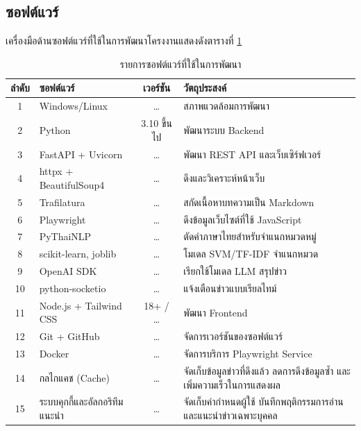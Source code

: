 \subsection{ซอฟต์แวร์}

เครื่องมือด้านซอฟต์แวร์ที่ใช้ในการพัฒนาโครงงานแสดงดังตารางที่ \ref{tab:software}

\begin{table}[H]
\centering
\caption{รายการซอฟต์แวร์ที่ใช้ในการพัฒนา}
\label{tab:software}
\begin{tabular}{|c|l|c|p{5.5cm}|}
\hline
\textbf{ลำดับ} & \textbf{ซอฟต์แวร์} & \textbf{เวอร์ชัน} & \textbf{วัตถุประสงค์} \\
\hline
1 & Windows/Linux & \ldots & สภาพแวดล้อมการพัฒนา \\ \hline
2 & Python & 3.10 ขึ้นไป & พัฒนาระบบ Backend \\ \hline
3 & FastAPI + Uvicorn & \ldots & พัฒนา REST API และเว็บเซิร์ฟเวอร์ \\ \hline
4 & httpx + BeautifulSoup4 & \ldots & ดึงและวิเคราะห์หน้าเว็บ \\ \hline
5 & Trafilatura & \ldots & สกัดเนื้อหาบทความเป็น Markdown \\ \hline
6 & Playwright & \ldots & ดึงข้อมูลเว็บไซต์ที่ใช้ JavaScript \\ \hline
7 & PyThaiNLP & \ldots & ตัดคำภาษาไทยสำหรับจำแนกหมวดหมู่ \\ \hline
8 & scikit-learn, joblib & \ldots & โมเดล SVM/TF-IDF จำแนกหมวด \\ \hline
9 & OpenAI SDK & \ldots & เรียกใช้โมเดล LLM สรุปข่าว \\ \hline
10 & python-socketio & \ldots & แจ้งเตือนข่าวแบบเรียลไทม์ \\ \hline
11 & Node.js + Tailwind CSS & 18+ / \ldots & พัฒนา Frontend \\ \hline
12 & Git + GitHub & \ldots & จัดการเวอร์ชันของซอฟต์แวร์ \\ \hline
13 & Docker & \ldots & จัดการบริการ Playwright Service \\ \hline
14 & กลไกแคช (Cache) & \ldots & จัดเก็บข้อมูลข่าวที่ดึงแล้ว ลดการดึงข้อมูลซ้ำ และเพิ่มความเร็วในการแสดงผล \\ \hline
15 & ระบบคุกกี้และอัลกอริทึมแนะนำ & \ldots & จัดเก็บค่ากำหนดผู้ใช้ บันทึกพฤติกรรมการอ่าน และแนะนำข่าวเฉพาะบุคคล \\
\hline
\end{tabular}
\end{table}

